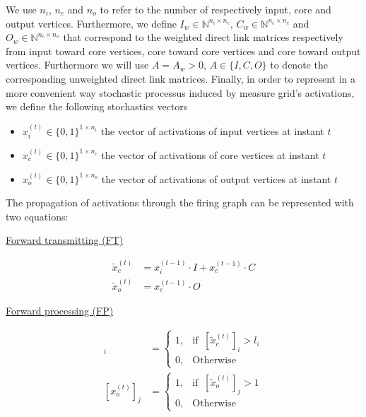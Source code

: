 \documentclass[a4paper, 11pt]{article}
\begin{document}
We use $n_i$, $n_c$ and $n_o$ to refer to the number of respectively input, core and output vertices. Furthermore, we define $I_w \in \mathbb{N}^{n_i \times n_c}$, $C_w \in \mathbb{N}^{n_c \times n_c}$ and $O_w \in \mathbb{N}^{n_c \times n_o}$ that correspond to the weighted direct link matrices respectively from input toward core vertices, core toward core vertices and core toward output vertices. Furthermore we will use $A = A_w > 0$, $A \in \{I, C, O \}$ to denote the corresponding unweighted direct link matrices. Finally, in order to represent in a more convenient way stochastic processus induced by measure grid's activations, we define the following stochastics vectors

\begin{itemize}
\item $x_i^{(t)} \in \{0, 1\}^{1 \times n_i}$ the vector of activations of input vertices at instant $t$
\item $x_c^{(t)} \in \{0, 1\}^{1 \times n_c}$ the vector of activations of core vertices at instant $t$
\item $x_o^{(t)} \in \{0, 1\}^{1 \times n_o}$ the vector of activations of output vertices at instant $t$

\end{itemize}

The propagation of activations through the firing graph can be represented with two equations:\\


\vspace{20px}\noindent\begin{minipage}{.5\linewidth}
\begin{center}
\underline{Forward transmitting (FT)}
\end{center}
\begin{align*}
\tilde{x}_c^{(t)} &= x_i^{(t-1)} \cdot I + x_c^{(t-1)} \cdot C  \\
\tilde{x}_o^{(t)} &= x_c^{(t-1)} \cdot O
\end{align*} 
\end{minipage}%
\noindent\begin{minipage}{.5\linewidth}
\begin{center}
\underline{Forward processing (FP)}
\end{center}
\begin{align*}
[x_c^{(t)}]_i &= \begin{cases} 1, & \text{if }\ [\tilde{x}_c^{(t)}]_i > l_i \\ 0, & \text{Otherwise} \end{cases}\\
[x_o^{(t)}]_j &= \begin{cases} 1, & \text{if }\ [\tilde{x}_o^{(t)}]_j > 1 \\ 0, & \text{Otherwise} \end{cases}  
\end{align*}
\end{minipage}\vspace{20px}
\end{document}
